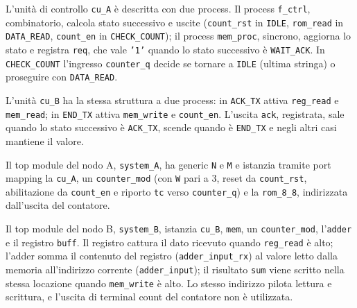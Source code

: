 
L'unità di controllo \texttt{cu\_A} è descritta con due process. Il process \texttt{f\_ctrl}, combinatorio, calcola stato successivo e uscite (\texttt{count\_rst} in \texttt{IDLE}, \texttt{rom\_read} in \texttt{DATA\_READ}, \texttt{count\_en} in \texttt{CHECK\_COUNT}); il process \texttt{mem\_proc}, sincrono, aggiorna lo stato e registra \texttt{req}, che vale \texttt{'1'} quando lo stato successivo è \texttt{WAIT\_ACK}. In \texttt{CHECK\_COUNT} l'ingresso \texttt{counter\_q} decide se tornare a \texttt{IDLE} (ultima stringa) o proseguire con \texttt{DATA\_READ}.


L'unità \texttt{cu\_B} ha la stessa struttura a due process: in \texttt{ACK\_TX} attiva \texttt{reg\_read} e \texttt{mem\_read}; in \texttt{END\_TX} attiva \texttt{mem\_write} e \texttt{count\_en}. L'uscita \texttt{ack}, registrata, sale quando lo stato successivo è \texttt{ACK\_TX}, scende quando è \texttt{END\_TX} e negli altri casi mantiene il valore.


Il top module del nodo A, \texttt{system\_A}, ha generic \texttt{N} e \texttt{M} e istanzia tramite port mapping la \texttt{cu\_A}, un \texttt{counter\_mod} (con \texttt{W} pari a 3, reset da \texttt{count\_rst}, abilitazione da \texttt{count\_en} e riporto \texttt{tc} verso \texttt{counter\_q}) e la \texttt{rom\_8\_8}, indirizzata dall'uscita del contatore.


Il top module del nodo B, \texttt{system\_B}, istanzia \texttt{cu\_B}, \texttt{mem}, un \texttt{counter\_mod}, l'\texttt{adder} e il registro \texttt{buff}. Il registro cattura il dato ricevuto quando \texttt{reg\_read} è alto; l'adder somma il contenuto del registro (\texttt{adder\_input\_rx}) al valore letto dalla memoria all'indirizzo corrente (\texttt{adder\_input}); il risultato \texttt{sum} viene scritto nella stessa locazione quando \texttt{mem\_write} è alto. Lo stesso indirizzo pilota lettura e scrittura, e l'uscita di terminal count del contatore non è utilizzata.


